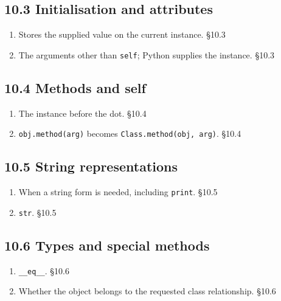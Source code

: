 \documentclass[11pt]{article}
\begin{document}
\begin{keepsection}\subsection{10.3 Initialisation and attributes}

\begin{enumerate}
\item Stores the supplied value on the current instance. \hfill{\small\color{FAUblue}§10.3}
\item The arguments other than \texttt{self}; Python supplies the instance. \hfill{\small\color{FAUblue}§10.3}
\end{enumerate}

\end{keepsection}
\begin{keepsection}\subsection{10.4 Methods and self}

\begin{enumerate}
\item The instance before the dot. \hfill{\small\color{FAUblue}§10.4}
\item \texttt{obj.method(arg)} becomes \texttt{Class.method(obj, arg)}. \hfill{\small\color{FAUblue}§10.4}
\end{enumerate}

\end{keepsection}
\begin{keepsection}\subsection{10.5 String representations}

\begin{enumerate}
\item When a string form is needed, including \texttt{print}. \hfill{\small\color{FAUblue}§10.5}
\item \texttt{str}. \hfill{\small\color{FAUblue}§10.5}
\end{enumerate}

\end{keepsection}
\begin{keepsection}\subsection{10.6 Types and special methods}

\begin{enumerate}
\item \texttt{\_\_eq\_\_}. \hfill{\small\color{FAUblue}§10.6}
\item Whether the object belongs to the requested class relationship. \hfill{\small\color{FAUblue}§10.6}
\end{enumerate}

\end{keepsection}
\end{document}
